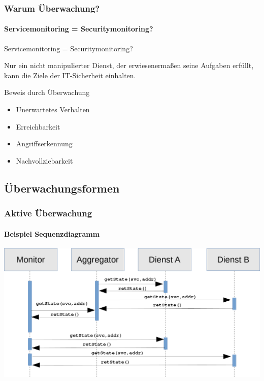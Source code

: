 \begin{frame}
    \frametitle{Warum Überwachung?}
        \framesubtitle{Servicemonitoring = Securitymonitoring?}
        \pause
        
        \begin{alertblock}{\centering Servicemonitoring = Securitymonitoring?}
            \vspace{0.3cm}
            \vspace{0.3cm}
            
            Nur ein nicht manipulierter Dienst, der erwiesenermaßen seine
            Aufgaben erfüllt, kann die Ziele der IT-Sicherheit einhalten.\\
            \vspace{0.3cm}
        \end{alertblock}     
    
        \pause
           
        \begin{alertblock}{Beweis durch Überwachung}
             \begin{itemize}
                 \item Unerwartetes Verhalten
                 \item Erreichbarkeit
                 \item Angriffserkennung
                 \item Nachvollziebarkeit
             \end{itemize}
        \end{alertblock}
    

\end{frame}

\subsection{Überwachungsformen}
\begin{frame}
    \frametitle{Aktive Überwachung}
        \framesubtitle{Beispiel Sequenzdiagramm}
        
        \includegraphics[scale=0.25]{img/sequence_uml_active_trans.png}

\end{frame}


